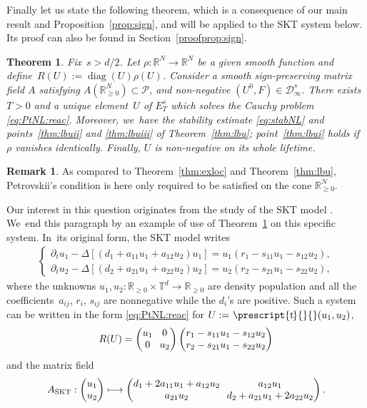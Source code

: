 \documentclass[10pt]{amsart}
\newcommand\mto{\mathchoice{\longmapsto}{\mapsto}{\mapsto}{\mapsto}}
\DeclareMathOperator{\diag}{diag}
\newcommand{\SKT}{\textup{SKT}}
\newtheorem{thm}{Theorem}
\theoremstyle{definition}
\newtheorem{rem}[prop]{Remark}
\newcommand\R{\mathbb{R}}
\newcommand\T{\mathbb{T}}
\newcommand*{\transp}[2][-2mu]{\ensuremath{\mskip1mu\prescript{\smash{\mathrm t\mkern#1}}{}{\mathstrut#2}}}%
\begin{document}
Finally let us state the following theorem, which is a consequence of our main result and Proposition~\ref{prop:sign}, and will be applied to the SKT system below. Its proof can also be found in Section~\ref{proofprop:sign}.
\begin{thm}\label{thm:SKT}
Fix~$s>d/2$. Let $\rho:\R^N\to\R^N$ be a given smooth function and define~$R(U):=\diag(U)\rho(U)$. Consider a smooth sign-preserving matrix field $A$ satisfying $A(\R_{\geq 0}^N)\subset \mathscr{P}$, and non-negative $(U^0,F)\in\mathcal{D}_\infty^s$. There exists $T>0$ and a unique element~$U$ of $E_T^s$ which solves the Cauchy problem \eqref{eq:PtNL:reac}. Moreover, we~have the stability estimate \eqref{eq:stabNL} and points~\eqref{thm:lbuii} and \eqref{thm:lbuiii} of Theorem~\ref{thm:lbu}; point~\eqref{thm:lbui} holds if~$\rho$ vanishes identically. Finally, $U$ is non-negative on its whole lifetime.
\end{thm}
\begin{rem}
As compared to Theorem~\ref{thm:exloc} and Theorem~\ref{thm:lbu}, Petrovskii's condition is here only required to be satisfied on the cone $\R^N_{\geq 0}$.
\end{rem}
Our interest in this question originates from the study of the SKT model \cite{skt}. We~end this paragraph by an example of use of Theorem~\ref{thm:SKT}
on this specific system. In~its original form, the SKT model writes
\begin{align}
\label{eq:SKT}
\left\{
\begin{aligned}
\partial_t u_1- \Delta[(d_1+a_{11}u_1+a_{12}u_2)u_1] = u_1(r_1-s_{11}u_1-s_{12}u_2),\\
\partial_t u_2- \Delta[(d_2+a_{21}u_1+a_{22}u_2)u_2] = u_2(r_2-s_{21}u_1-s_{22}u_2),
\end{aligned}
\right.
\end{align}
where the unknowns $u_1,u_2:\R_{\geq 0}\times\T^d\to\R_{\geq 0}$ are density population and all the coefficients~$a_{ij}$, $r_i$, $s_{ij}$ are nonnegative while the $d_i$'s are positive. Such a system can be written in the form \eqref{eq:PtNL:reac} for $U:=\transp{}{(u_1,u_2)}$,
\[\arraycolsep3.5pt
R(U) =
\begin{pmatrix}
u_1 & 0 \\
0 & u_2
\end{pmatrix}\begin{pmatrix}
r_1-s_{11}u_1-s_{12}u_2\\
r_2-s_{21}u_1-s_{22}u_2
\end{pmatrix}
\]
and the matrix field
\begin{align}\label{def:ASKT}\arraycolsep3.5pt
A_{\SKT}:\begin{pmatrix} u_1\\u_2\end{pmatrix} \mto
\begin{pmatrix} d_1+2a_{11}u_1+a_{12}u_2 & a_{12}u_1\\
a_{21}u_2 & d_2+ a_{21}u_1+2 a_{22}u_2
\end{pmatrix}.
\end{align}
\end{document}
